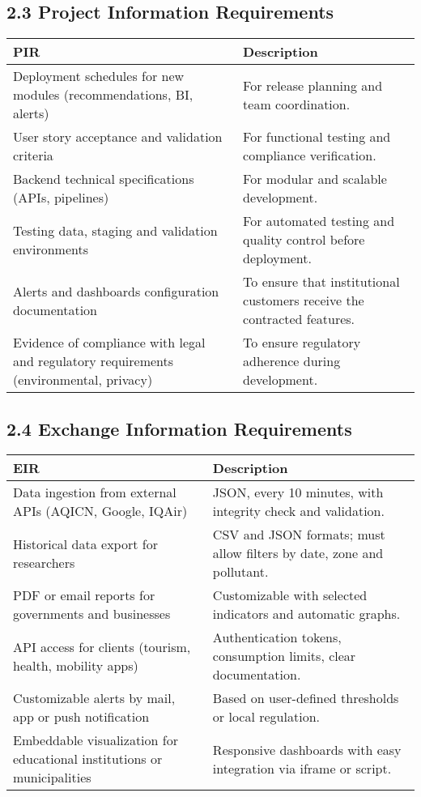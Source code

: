 \vspace{1.5cm}
\subsection*{2.3 Project Information Requirements}

\begin{tabular}{|p{6cm}|p{9cm}|}
\hline
\textbf{PIR} & \textbf{Description} \\
\hline
Deployment schedules for new modules (recommendations, BI, alerts) & For release planning and team coordination. \\
\hline
User story acceptance and validation criteria & For functional testing and compliance verification. \\
\hline
Backend technical specifications (APIs, pipelines) & For modular and scalable development. \\
\hline
Testing data, staging and validation environments & For automated testing and quality control before deployment. \\
\hline
Alerts and dashboards configuration documentation & To ensure that institutional customers receive the contracted features. \\
\hline
Evidence of compliance with legal and regulatory requirements (environmental, privacy) & To ensure regulatory adherence during development. \\
\hline
\end{tabular}

\vspace{1.5cm}
\subsection*{2.4 Exchange Information Requirements}

\begin{tabular}{|p{6cm}|p{9cm}|}
\hline
\textbf{EIR} & \textbf{Description} \\
\hline
Data ingestion from external APIs (AQICN, Google, IQAir) & JSON, every 10 minutes, with integrity check and validation. \\
\hline
Historical data export for researchers & CSV and JSON formats; must allow filters by date, zone and pollutant. \\
\hline
PDF or email reports for governments and businesses & Customizable with selected indicators and automatic graphs. \\
\hline
API access for clients (tourism, health, mobility apps) & Authentication tokens, consumption limits, clear documentation. \\
\hline
Customizable alerts by mail, app or push notification & Based on user-defined thresholds or local regulation. \\
\hline
Embeddable visualization for educational institutions or municipalities & Responsive dashboards with easy integration via iframe or script. \\
\hline
\end{tabular}
\newpage